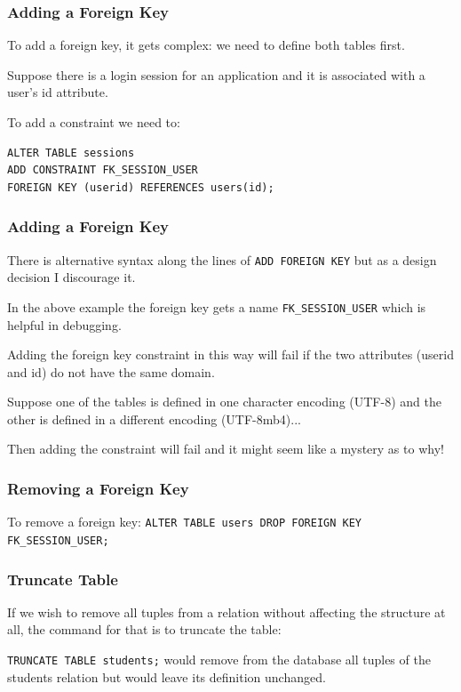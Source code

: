 \begin{frame}[fragile]
\frametitle{Adding a Foreign Key}

To add a foreign key, it gets complex: we need to define both tables first. 

Suppose there is a login session for an application and it is associated with a user's id attribute. 

To add a constraint we need to:

\begin{verbatim}
ALTER TABLE sessions
ADD CONSTRAINT FK_SESSION_USER
FOREIGN KEY (userid) REFERENCES users(id);
\end{verbatim}

\end{frame}

\begin{frame}
\frametitle{Adding a Foreign Key}

There is alternative syntax along the lines of \texttt{ADD FOREIGN KEY} but as a design decision I discourage it. 

In the above example the foreign key gets a name \texttt{FK\_SESSION\_USER} which is helpful in debugging. 

Adding the foreign key constraint in this way will fail if the two attributes (userid and id) do not have the same domain. 

Suppose one of the tables is defined in one character encoding (UTF-8) and the other is defined in a different encoding (UTF-8mb4)...

Then adding the constraint will fail and it might seem like a mystery as to why!

\end{frame}

\begin{frame}
\frametitle{Removing a Foreign Key}

To remove a foreign key: \texttt{ALTER TABLE users DROP FOREIGN KEY FK\_SESSION\_USER;}

\end{frame}


\begin{frame}
\frametitle{Truncate Table}

If we wish to remove all tuples from a relation without affecting the structure at all, the command for that is to truncate the table: 

\texttt{TRUNCATE TABLE students;} would remove from the database all tuples of the students relation but would leave its definition unchanged. 

\end{frame}


